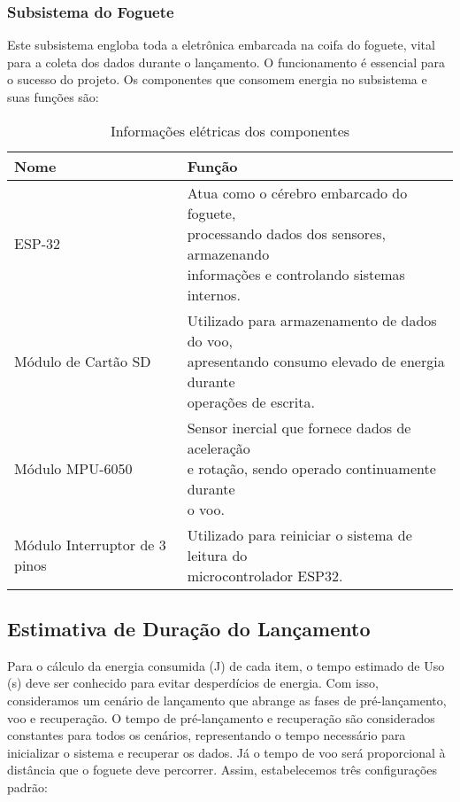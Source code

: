 \subsubsection{Subsistema do Foguete}

Este subsistema engloba toda a eletrônica embarcada na coifa do foguete, vital para a coleta dos dados durante o lançamento. O funcionamento é essencial para o sucesso do projeto. Os componentes que consomem energia no subsistema e suas funções são: 

\begin{table}[H]
    \centering
    \caption{Informações elétricas dos componentes}
    \label{tab:componentes}
    \begin{tabular}{|l|l|}
        \hline
        Nome & Função \\
        \hline
        ESP-32 & \makecell[l]{Atua como o cérebro embarcado do foguete, \\ processando dados dos sensores, armazenando \\ informações e controlando sistemas internos.} \\
		\hline
        Módulo de Cartão SD & \makecell[l]{Utilizado para armazenamento de dados do voo, \\ apresentando consumo elevado de energia durante \\ operações de escrita.} \\
		\hline
		Módulo MPU-6050 & \makecell[l]{Sensor inercial que fornece dados de aceleração \\ e rotação, sendo operado continuamente durante \\ o voo.} \\
		\hline
		Módulo Interruptor de 3 pinos & \makecell[l]{Utilizado para reiniciar o sistema de leitura do \\ microcontrolador ESP32.} \\
		\hline
    \end{tabular}
\end{table}

\subsection{Estimativa de Duração do Lançamento}

Para o cálculo da energia consumida (J) de cada item, o tempo estimado de Uso (s) deve ser conhecido para evitar desperdícios de energia. Com isso, consideramos um cenário de lançamento que abrange as fases de pré-lançamento, voo e recuperação. O tempo de pré-lançamento e recuperação são considerados constantes para todos os cenários, representando o tempo necessário para inicializar o sistema e recuperar os dados. Já o tempo de voo será proporcional à distância que o foguete deve percorrer. Assim, estabelecemos três configurações padrão: 
 
